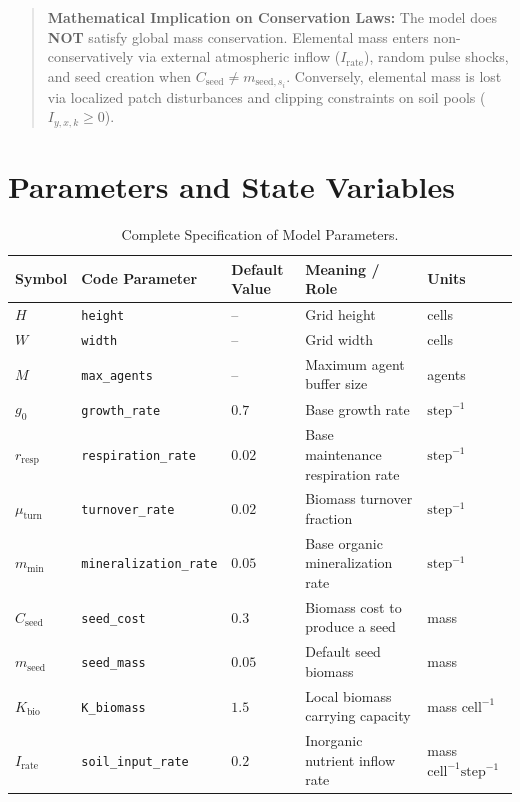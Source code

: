\documentclass[11pt,a4paper]{article}
\begin{document}
\begin{quote}
\textbf{Mathematical Implication on Conservation Laws:} The model does \textbf{NOT} satisfy global mass conservation. Elemental mass enters non-conservatively via external atmospheric inflow ($I_{\text{rate}}$), random pulse shocks, and seed creation when $C_{\text{seed}} \neq m_{\text{seed}, s_i}$. Conversely, elemental mass is lost via localized patch disturbances and clipping constraints on soil pools ($I_{y,x,k} \ge 0$).
\end{quote}

\section{Parameters and State Variables}

\begin{longtable}{lllp{4.5cm}l}
\caption{Complete Specification of Model Parameters.} \label{tab:parameters} \\
\toprule
\textbf{Symbol} & \textbf{Code Parameter} & \textbf{Default Value} & \textbf{Meaning / Role} & \textbf{Units} \\
\midrule
\endhead
$H$ & \texttt{height} & -- & Grid height & cells \\
$W$ & \texttt{width} & -- & Grid width & cells \\
$M$ & \texttt{max\_agents} & -- & Maximum agent buffer size & agents \\
$g_0$ & \texttt{growth\_rate} & $0.7$ & Base growth rate & $\text{step}^{-1}$ \\
$r_{\text{resp}}$ & \texttt{respiration\_rate} & $0.02$ & Base maintenance respiration rate & $\text{step}^{-1}$ \\
$\mu_{\text{turn}}$ & \texttt{turnover\_rate} & $0.02$ & Biomass turnover fraction & $\text{step}^{-1}$ \\
$m_{\text{min}}$ & \texttt{mineralization\_rate} & $0.05$ & Base organic mineralization rate & $\text{step}^{-1}$ \\
$C_{\text{seed}}$ & \texttt{seed\_cost} & $0.3$ & Biomass cost to produce a seed & mass \\
$m_{\text{seed}}$ & \texttt{seed\_mass} & $0.05$ & Default seed biomass & mass \\
$K_{\text{bio}}$ & \texttt{K\_biomass} & $1.5$ & Local biomass carrying capacity & mass $\text{cell}^{-1}$ \\
$I_{\text{rate}}$ & \texttt{soil\_input\_rate} & $0.2$ & Inorganic nutrient inflow rate & mass $\text{cell}^{-1} \text{step}^{-1}$ \\

\end{longtable}
\end{document}
